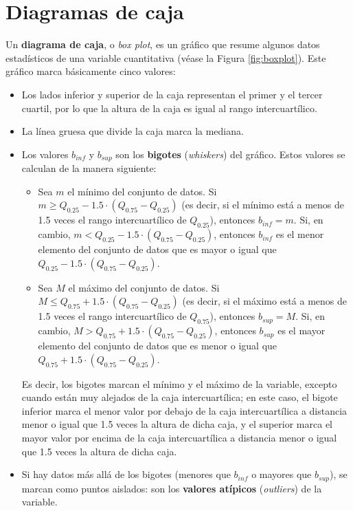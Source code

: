 \documentclass[
]{book}
\theoremstyle{definition}
\theoremstyle{definition}
\theoremstyle{definition}
\theoremstyle{remark}
\begin{document}
\hypertarget{diagramas-de-caja}{%
\section{Diagramas de caja}\label{diagramas-de-caja}}

Un \textbf{diagrama de caja}, o \emph{box plot}, es un gráfico que resume algunos datos estadísticos de una variable cuantitativa (véase la Figura \ref{fig:boxplot}). Este gráfico marca básicamente cinco valores:

\begin{itemize}
\item
  Los lados inferior y superior de la caja representan el primer y el tercer cuartil, por lo que la altura de la caja es igual al rango intercuartílico.
\item
  La línea gruesa que divide la caja marca la mediana.
\item
  Los valores \(b_{inf}\) y \(b_{sup}\) son los \textbf{bigotes} (\emph{whiskers}) del gráfico. Estos valores se calculan de la manera siguiente:

  \begin{itemize}
  \item
    Sea \(m\) el mínimo del conjunto de datos. Si \(m\geqslant Q_{0.25}-1.5\cdot(Q_{0.75}-Q_{0.25})\) (es decir, si el mínimo está a menos de 1.5 veces el rango intercuartílico de \(Q_{0.25}\)), entonces \(b_{inf}=m\). Si, en cambio, \(m< Q_{0.25}-1.5\cdot(Q_{0.75}-Q_{0.25})\), entonces \(b_{inf}\) es el menor elemento del conjunto de datos que es mayor o igual que \(Q_{0.25}-1.5\cdot(Q_{0.75}-Q_{0.25})\).
  \item
    Sea \(M\) el máximo del conjunto de datos. Si \(M\leqslant Q_{0.75}+1.5\cdot(Q_{0.75}-Q_{0.25})\) (es decir, si el máximo está a menos de 1.5 veces el rango intercuartílico de \(Q_{0.75}\)), entonces \(b_{sup}=M\). Si, en cambio, \(M> Q_{0.75}+1.5\cdot(Q_{0.75}-Q_{0.25})\), entonces \(b_{sup}\) es el mayor elemento del conjunto de datos que es menor o igual que \(Q_{0.75}+1.5\cdot(Q_{0.75}-Q_{0.25})\).
  \end{itemize}

  Es decir, los bigotes marcan el mínimo y el máximo de la variable, excepto cuando están muy alejados de la caja intercuartílica; en este caso, el bigote inferior marca el menor valor por debajo de la caja intercuartílica a distancia menor o igual que 1.5 veces la altura de dicha caja, y el superior marca el mayor valor por encima de la caja intercuartílica a distancia menor o igual que 1.5 veces la altura de dicha caja.
\item
  Si hay datos más allá de los bigotes (menores que \(b_{inf}\) o mayores que \(b_{sup}\)), se marcan como puntos aislados: son los \textbf{valores atípicos} (\emph{outliers}) de la variable.
\end{itemize}
\end{document}

